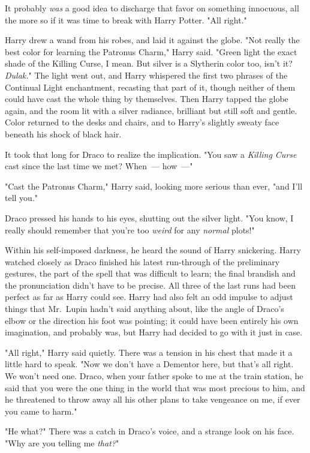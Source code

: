 {\el} It probably \emph{was} a good idea to discharge that favor on something
innocuous, all the more so if it was time to break with Harry Potter. "All
right."

Harry drew a wand from his robes, and laid it against the globe. "Not really
the best color for learning the Patronus Charm," Harry said. "Green light the
exact shade of the Killing Curse, I mean. But silver is a Slytherin color too,
isn't it? \emph{Dulak.}" The light went out, and Harry whispered the first two
phrases of the Continual Light enchantment, recasting that part of it, though
neither of them could have cast the whole thing by themselves. Then Harry
tapped the globe again, and the room lit with a silver radiance, brilliant but
still soft and gentle. Color returned to the desks and chairs, and to Harry's
slightly sweaty face beneath his shock of black hair.

It took that long for Draco to realize the implication. "You saw a
\emph{Killing Curse} cast since the last time we met? When~--- how~---"

"Cast the Patronus Charm," Harry said, looking more serious than ever, "and
I'll tell you."

Draco pressed his hands to his eyes, shutting out the silver light. "You know,
I really should remember that you're too \emph{weird} for any \emph{normal}
plots!"

Within his self-imposed darkness, he heard the sound of Harry snickering.
\sbreak
Harry watched closely as Draco finished his latest run-through of the
preliminary gestures, the part of the spell that was difficult to learn; the
final brandish and the pronunciation didn't have to be precise. All three of
the last runs had been perfect as far as Harry could see. Harry had also felt
an odd impulse to adjust things that Mr.~Lupin hadn't said anything about, like
the angle of Draco's elbow or the direction his foot was pointing; it could
have been entirely his own imagination, and probably was, but Harry had decided
to go with it just in case.

"All right," Harry said quietly. There was a tension in his chest that made it
a little hard to speak. "Now we don't have a Dementor here, but that's all
right. We won't need one. Draco, when your father spoke to me at the train
station, he said that you were the one thing in the world that was most
precious to him, and he threatened to throw away all his other plans to take
vengeance on me, if ever you came to harm."

"He{\el} what?" There was a catch in Draco's voice, and a strange look on
his face. "Why are you telling me \emph{that?}"

